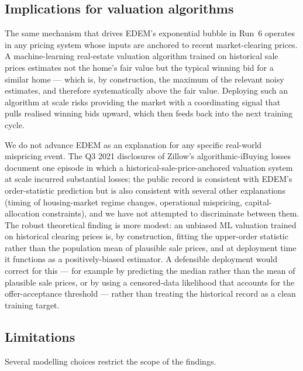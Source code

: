 \subsection{Implications for valuation algorithms}
\label{sec:disc-ml}

The same mechanism that drives EDEM's exponential bubble in Run~6
operates in any pricing system whose inputs are anchored to recent
market-clearing prices. A machine-learning real-estate valuation
algorithm trained on historical sale prices estimates not the home's
fair value but the typical winning bid for a similar home --- which
is, by construction, the maximum of the relevant noisy estimates,
and therefore systematically above the fair value. Deploying such an
algorithm at scale risks providing the market with a coordinating
signal that pulls realised winning bids upward, which then feeds
back into the next training cycle.

We do not advance EDEM as an explanation for any specific real-world
mispricing event. The Q3 2021 disclosures of Zillow's algorithmic-iBuying
losses \citep{zillow2021ibuying} document one episode in which a
historical-sale-price-anchored valuation system at scale incurred
substantial losses; the public record is consistent with EDEM's
order-statistic prediction but is also consistent with several other
explanations (timing of housing-market regime changes, operational
mispricing, capital-allocation constraints), and we have not
attempted to discriminate between them. The robust theoretical
finding is more modest: an unbiased ML valuation trained on
historical clearing prices is, by construction, fitting the
upper-order statistic rather than the population mean of plausible
sale prices, and at deployment time it functions as a
positively-biased estimator. A defensible deployment would correct
for this --- for example by predicting the median rather than the
mean of plausible sale prices, or by using a censored-data
likelihood that accounts for the offer-acceptance threshold ---
rather than treating the historical record as a clean training
target.

\subsection{Limitations}
\label{sec:disc-limits}

Several modelling choices restrict the scope of the findings.

